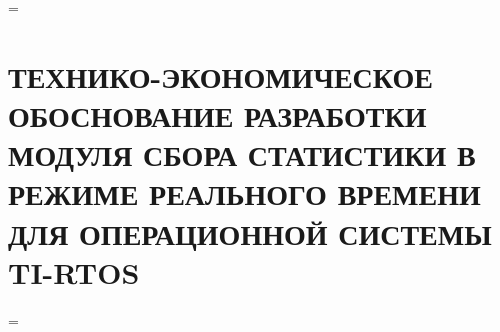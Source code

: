 \newcommand{\rub}{руб}

\newdimen\origiwstr
\origiwstr=\font
{}\origiwstr
\section{ТЕХНИКО-ЭКОНОМИЧЕСКОЕ ОБОСНОВАНИЕ РАЗРАБОТКИ МОДУЛЯ СБОРА СТАТИСТИКИ В РЕЖИМЕ РЕАЛЬНОГО ВРЕМЕНИ ДЛЯ ОПЕРАЦИОННОЙ СИСТЕМЫ TI-RTOS}
\font=\origiwstr

















